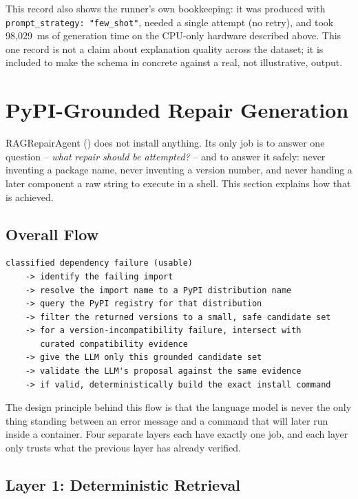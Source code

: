 This record also shows the runner's own bookkeeping: it was produced with
\texttt{prompt\_strategy: "few\_shot"}, needed a single attempt (no retry),
and took 98{,}029~ms of generation time on the CPU-only hardware described
above. This one record is not a claim about explanation quality across the
dataset; it is included to make the schema in
 concrete against a real, not illustrative,
output.

\section{PyPI-Grounded Repair Generation}
\label{sec:m-repair}

RAGRepairAgent () does not install anything. Its
only job is to answer one question -- \emph{what repair should be
attempted?} -- and to answer it safely: never inventing a package name,
never inventing a version number, and never handing a later component a raw
string to execute in a shell. This section explains how that is achieved.

\subsection{Overall Flow}

\begin{verbatim}
classified dependency failure (usable)
    -> identify the failing import
    -> resolve the import name to a PyPI distribution name
    -> query the PyPI registry for that distribution
    -> filter the returned versions to a small, safe candidate set
    -> for a version-incompatibility failure, intersect with
       curated compatibility evidence
    -> give the LLM only this grounded candidate set
    -> validate the LLM's proposal against the same evidence
    -> if valid, deterministically build the exact install command
\end{verbatim}

The design principle behind this flow is that the language model is never
the only thing standing between an error message and a command that will
later run inside a container. Four separate layers each have exactly one
job, and each layer only trusts what the previous layer has already
verified.

\subsection{Layer 1: Deterministic Retrieval}
\label{sec:m-repair-retrieval}

